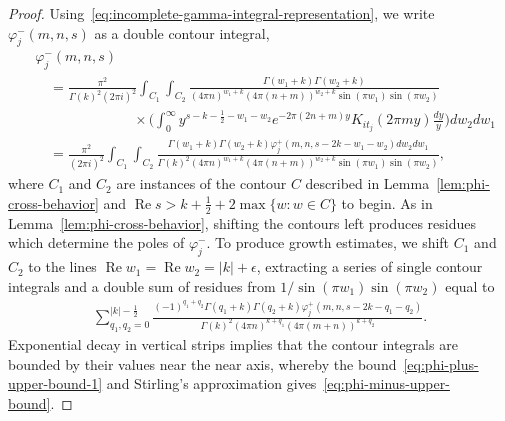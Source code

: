 \documentclass[11pt,reqno]{amsart}
\theoremstyle{plain}
\theoremstyle{definition}
\numberwithin{equation}{section}
\renewcommand{\Re}{\operatorname{Re}}
\begin{document}
\begin{proof}
Using~\eqref{eq:incomplete-gamma-integral-representation}, we write $\varphi_j^-(m,n,s)$ as a double contour integral,
\begin{align} \label{eq:phi-minus-double-integral}
	&\varphi_j^-(m,n,s)\\
		&\quad 
		= \frac{\pi^2}{\Gamma(k)^2 (2\pi i)^2} \int_{C_1} \int_{C_2}
		\frac{\Gamma(w_1+k) \Gamma(w_2+k) }
				{(4\pi n)^{w_1+k}(4\pi (n+m))^{w_2+k}\sin(\pi w_1) \sin(\pi w_2)}
		\\
		&\qquad \qquad\qquad\quad \times
		\Big(\int_0^\infty \! y^{s-k-\frac{1}{2}-w_1-w_2}
			e^{-2\pi (2n+m) y} K_{it_j}(2\pi m y) \frac{dy}{y}\Big) dw_2 dw_1 \\
		&\quad= \frac{\pi^2}{(2\pi i)^2} 
		\!\!\int_{C_1} \int_{C_2} \!\!\!\!
		\frac{\Gamma(w_1+k) \Gamma(w_2+k)\varphi_j^+(m,n,s-2k-w_1-w_2) dw_2 dw_1}
				{\Gamma(k)^2 (4\pi n)^{w_1+k}(4\pi (n+m))^{w_2+k}\sin(\pi w_1) \sin(\pi w_2)},
\end{align}
where $C_1$ and $C_2$ are instances of the contour $C$ described in Lemma~\ref{lem:phi-cross-behavior} and $\Re s > k +\frac{1}{2} + 2\max\{w : w \in C\}$ to begin. As in Lemma~\ref{lem:phi-cross-behavior}, shifting the contours left produces residues which determine the poles of $\varphi_j^-$. To produce growth estimates, we shift $C_1$ and $C_2$ to the lines $\Re w_1 = \Re w_2 = \vert k \vert + \epsilon$, extracting a series of single contour integrals and a double sum of residues from $1/\sin(\pi w_1)\sin(\pi w_2)$ equal to
\begin{align} \label{eq:phi-minus-residues}
	\sum_{q_1,q_2=0}^{\vert k \vert - \frac{1}{2}} \!
		\frac{(-1)^{q_1 + q_2} \Gamma(q_1+k)\Gamma(q_2 + k) \varphi_j^+(m,n,s-2k-q_1 - q_2)}
			{\Gamma(k)^2 (4\pi n)^{k+q_1} (4\pi(m+n))^{k+q_2}}.
\end{align}
Exponential decay in vertical strips implies that the contour integrals are bounded by their values near the near axis, whereby the bound~\eqref{eq:phi-plus-upper-bound-1} and Stirling's approximation gives~\eqref{eq:phi-minus-upper-bound}.
\end{proof}
\end{document}
